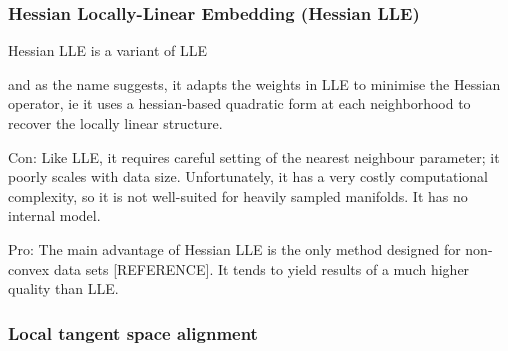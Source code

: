 \documentclass[journal, a4paper]{IEEEtran}
\begin{document}
%	
%	

\subsubsection{Hessian Locally-Linear Embedding (Hessian LLE)}
Hessian LLE is a variant of LLE

and as the name suggests, it adapts the weights in LLE to minimise the Hessian operator, ie it uses a hessian-based quadratic form at each neighborhood to recover the locally linear structure. 

Con: Like LLE, it requires careful setting of the nearest neighbour parameter; it poorly scales with data size.
Unfortunately, it has a very costly computational complexity, so it is not well-suited for heavily sampled manifolds. It has no internal model.

Pro: The main advantage of Hessian LLE is the only method designed for non-convex data sets [REFERENCE].
It tends to yield results of a much higher quality than LLE. 



\subsubsection{Local tangent space alignment}
\end{document}
